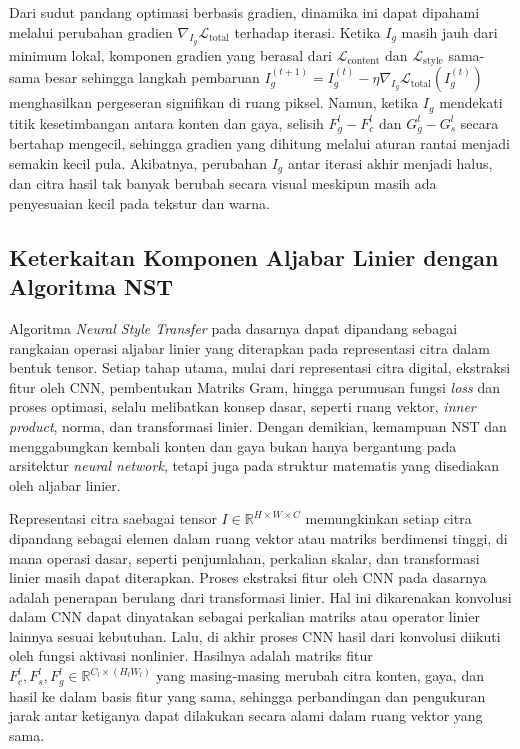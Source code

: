 Dari sudut pandang optimasi berbasis gradien, dinamika ini dapat dipahami melalui perubahan gradien $\nabla_{I_g} \mathcal{L}_{\text{total}}$ terhadap iterasi. Ketika $I_g$ masih jauh dari minimum lokal, komponen gradien yang berasal dari $\mathcal{L}_{\text{content}}$ dan $\mathcal{L}_{\text{style}}$ sama-sama besar sehingga langkah pembaruan $I_g^{(t+1)} = I_g^{(t)} - \eta \nabla_{I_g} \mathcal{L}_{\text{total}}(I_g^{(t)})$ menghasilkan pergeseran signifikan di ruang piksel. Namun, ketika $I_g$ mendekati titik kesetimbangan antara konten dan gaya, selisih $F_g^l - F_c^l$ dan $G_g^l - G_s^l$ secara bertahap mengecil, sehingga gradien yang dihitung melalui aturan rantai menjadi semakin kecil pula. Akibatnya, perubahan $I_g$ antar iterasi akhir menjadi halus, dan citra hasil tak banyak berubah secara visual meskipun masih ada penyesuaian kecil pada tekstur dan warna.

\subsection{Keterkaitan Komponen Aljabar Linier dengan Algoritma NST}

Algoritma \textit{Neural Style Transfer} pada dasarnya dapat dipandang sebagai rangkaian operasi aljabar linier yang diterapkan pada representasi citra dalam bentuk tensor. Setiap tahap utama, mulai dari representasi citra digital, ekstraksi fitur oleh CNN, pembentukan Matriks Gram, hingga perumusan fungsi \textit{loss} dan proses optimasi, selalu melibatkan konsep dasar, seperti ruang vektor, \textit{inner product}, norma, dan transformasi linier. Dengan demikian, kemampuan NST dan menggabungkan kembali konten dan gaya bukan hanya bergantung pada arsitektur \textit{neural network}, tetapi juga pada struktur matematis yang disediakan oleh aljabar linier. 

Representasi citra saebagai tensor $I \in \mathbb{R}^{H \times W \times C}$ memungkinkan setiap citra dipandang sebagai elemen dalam ruang vektor atau matriks berdimensi tinggi, di mana operasi dasar, seperti penjumlahan, perkalian skalar, dan transformasi linier masih dapat diterapkan. Proses ekstraksi fitur oleh CNN pada dasarnya adalah penerapan berulang dari transformasi linier. Hal ini dikarenakan konvolusi dalam CNN dapat dinyatakan sebagai perkalian matriks atau operator linier lainnya sesuai kebutuhan. Lalu, di akhir proses CNN hasil dari konvolusi diikuti oleh fungsi aktivasi nonlinier. Hasilnya adalah matriks fitur $F_c^l, F_s^l, F_g^l \in \mathbb{R}^{C_l \times (H_l W_l)}$ yang masing-masing merubah citra konten, gaya, dan hasil ke dalam basis fitur yang sama, sehingga perbandingan dan pengukuran jarak antar ketiganya dapat dilakukan secara alami dalam ruang vektor yang sama.

